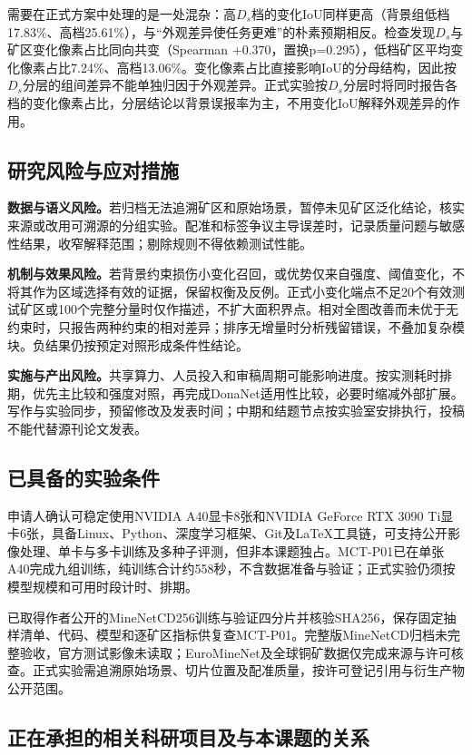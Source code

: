 需要在正式方案中处理的是一处混杂：高$D_s$档的变化IoU同样更高（背景组低档17.83\%、高档25.61\%），与“外观差异使任务更难”的朴素预期相反。检查发现$D_s$与矿区变化像素占比同向共变（Spearman $+0.370$，置换p=0.295），低档矿区平均变化像素占比7.24\%、高档13.06\%。变化像素占比直接影响IoU的分母结构，因此按$D_s$分层的组间差异不能单独归因于外观差异。正式实验按$D_s$分层时将同时报告各档的变化像素占比，分层结论以背景误报率为主，不用变化IoU解释外观差异的作用。

\subsection{研究风险与应对措施}
\textbf{数据与语义风险。}若归档无法追溯矿区和原始场景，暂停未见矿区泛化结论，核实来源或改用可溯源的分组实验。配准和标签争议主导误差时，记录质量问题与敏感性结果，收窄解释范围；剔除规则不得依赖测试性能。

\textbf{机制与效果风险。}若背景约束损伤小变化召回，或优势仅来自强度、阈值变化，不将其作为区域选择有效的证据，保留权衡及反例。正式小变化端点不足20个有效测试矿区或100个完整分量时仅作描述，不扩大面积界点。相对全图改善而未优于无约束时，只报告两种约束的相对差异；排序无增量时分析残留错误，不叠加复杂模块。负结果仍按预定对照形成条件性结论。

\textbf{实施与产出风险。}共享算力、人员投入和审稿周期可能影响进度。按实测耗时排期，优先主比较和强度对照，再完成DonaNet适用性比较，必要时缩减外部扩展。写作与实验同步，预留修改及发表时间；中期和结题节点按实验室安排执行，投稿不能代替源刊论文发表。

\subsection{已具备的实验条件}
申请人确认可稳定使用NVIDIA A40显卡8张和NVIDIA GeForce RTX 3090 Ti显卡6张，具备Linux、Python、深度学习框架、Git及LaTeX工具链，可支持公开影像处理、单卡与多卡训练及多种子评测，但非本课题独占。MCT-P01已在单张A40完成九组训练，纯训练合计约558秒，不含数据准备与验证；正式实验仍须按模型规模和可用时段计时、排期。

已取得作者公开的MineNetCD256训练与验证四分片并核验SHA256，保存固定抽样清单、代码、模型和逐矿区指标供复查MCT-P01。完整版MineNetCD归档未完整验收，官方测试影像未读取；EuroMineNet及全球铜矿数据仅完成来源与许可核查。正式实验需追溯原始场景、切片位置及配准质量，按许可登记引用与衍生产物公开范围。

\subsection{正在承担的相关科研项目及与本课题的关系}
\label{sec:mct-ongoing-projects}

